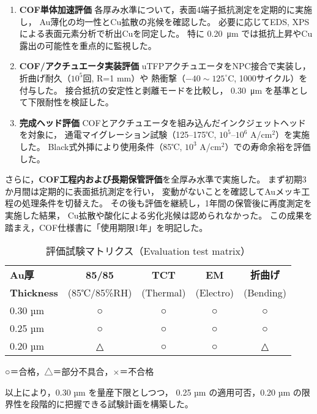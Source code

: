 \documentclass[conference]{IEEEtran}
\begin{document}
\begin{enumerate}
  \item \textbf{COF単体加速評価}  
        各厚み水準について，表面4端子抵抗測定を定期的に実施し，
        Au薄化の均一性とCu拡散の兆候を確認した。  
        必要に応じてEDS, XPSによる表面元素分析で析出Cuを同定した。  
        特に \SI{0.20}{\micro\meter} では抵抗上昇やCu露出の可能性を重点的に監視した。
  \item \textbf{COF/アクチュエータ実装評価}  
        uTFPアクチュエータをNPC接合で実装し，折曲げ耐久（$10^5$回, R=1 mm）や
        熱衝撃（$-40\sim125^\circ$C, 1000サイクル）を付与した。  
        接合抵抗の安定性と剥離モードを比較し，
        \SI{0.30}{\micro\meter} を基準として下限耐性を検証した。
  \item \textbf{完成ヘッド評価}  
        COFとアクチュエータを組み込んだインクジェットヘッドを対象に，
        通電マイグレーション試験（125--175℃, $10^5$--$10^6$ A/cm$^2$）を実施した。  
        Black式外挿により使用条件（85℃, $10^3$ A/cm$^2$）での寿命余裕を評価した。
\end{enumerate}

さらに，\textbf{COF工程内および長期保管評価}を全厚み水準で実施した。  
まず初期3か月間は定期的に表面抵抗測定を行い，
変動がないことを確認してAuメッキ工程の処理条件を切替えた。  
その後も評価を継続し，1年間の保管後に再度測定を実施した結果，
Cu拡散や酸化による劣化兆候は認められなかった。  
この成果を踏まえ，COF仕様書に「使用期限1年」を明記した。

\begin{table}[htbp]
  \centering
  \caption{評価試験マトリクス（Evaluation test matrix）}
  \label{tab:test-matrix}
  \begin{tabular}{@{}lcccc@{}}
    \toprule
    \textbf{Au厚} & \textbf{85/85} & \textbf{TCT} & \textbf{EM} & \textbf{折曲げ} \\
    \textbf{Thickness} & (85℃/85\%RH) & (Thermal) & (Electro) & (Bending) \\
    \midrule
    0.30 µm & ○ & ○ & ○ & ○ \\
    0.25 µm & ○ & ○ & ○ & ○ \\
    0.20 µm & △ & ○ & ○ & △ \\
    \bottomrule
  \end{tabular}
  \vspace{2pt}
  \footnotesize{○＝合格，△＝部分不具合，×＝不合格}
\end{table}

\vspace{2mm}
\noindent
以上により，0.30 µm を量産下限としつつ，
0.25 µm の適用可否，0.20 µm の限界性を段階的に把握できる試験計画を構築した。
\end{document}
